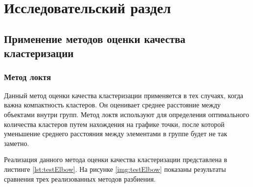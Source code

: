 \chapter{Исследовательский раздел}

\section{Применение методов оценки качества кластеризации}

\subsection{Метод локтя}

Данный метод оценки качества кластеризации применяется в тех случаях, когда важна компактность кластеров. Он оценивает среднее расстояние между объектами внутри групп. Метод локтя используют для определения оптимального количества кластеров путем нахождения на графике точки, после которой уменьшение среднего расстояния между элементами в группе будет не так заметно. 

Реализация данного метода оценки качества кластеризации представлена в листинге \ref{lst:testElbow}.
На рисунке \ref{img:testElbow} показаны результаты сравнения трех реализованных методов разбиения.

